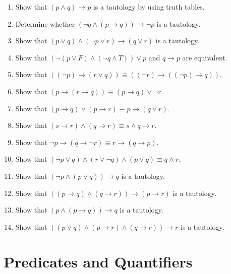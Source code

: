 \documentclass{sig-alternate-05-2015}
\begin{document}
\begin{enumerate}
\item Show that $(p \wedge q) \rightarrow p$ is a tautology
by using truth tables.

\item Determine whether $(\neg q \wedge (p \rightarrow q)) \rightarrow \neg p$ is a tautology.

\item Show that $(p \vee q) \wedge (\neg p \vee r) \rightarrow (q \vee r)$ is a tautology.

\item Show that $(\neg(p \vee F) \wedge (\neg q \wedge T)) \vee p$ and $q\rightarrow p$ are equivalent.

\item Show that $((\neg p) \rightarrow (r\vee q)) \equiv ((\neg r)\rightarrow ((\neg p)\rightarrow q))$.

\item Show that $(p \rightarrow (r \rightarrow q))\equiv (p \rightarrow q)\vee \neg r$.

\item Show that $(p \rightarrow q) \vee (p \rightarrow r) \equiv p \rightarrow (q\vee r)$.

\item Show that $(s \rightarrow r) \wedge (q \rightarrow r) \equiv s\wedge q \rightarrow  r$.

\item Show that $\neg p \rightarrow (q \rightarrow \neg r)\equiv r \rightarrow (q \rightarrow p)$.

\item Show that $(\neg p \vee q) \wedge (r \vee \neg q) \wedge (p \vee q) \equiv q\wedge r$.

\item Show that $(\neg p \wedge (p \vee q))\rightarrow q$ is a tautology.

\item Show that $((p\rightarrow q)\wedge (q\rightarrow r)) \rightarrow (p\rightarrow r)$ is a  tautology.

\item Show that $(p\wedge (p \rightarrow q))\rightarrow q$ is a tautology.

\item Show that $((p\vee q)\wedge (p \rightarrow r) \wedge (q\rightarrow r))\rightarrow r$ is a  tautology.
\end{enumerate}

\section{Predicates and Quantifiers}
\end{document}
